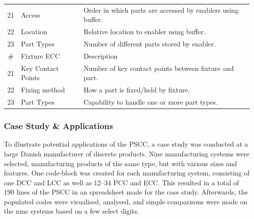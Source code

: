 \begin{table}[tb]
\begin{tabular}{cll}
    \midrule
    21 & Access & Order in which parts are accessed by enablers using buffer.\\
    22 & Location & Relative location to enabler using buffer.\\
    23 & Part Types & Number of different parts stored by enabler.\\
    \midrule
    \# & Fixture ECC & Description\\
    \midrule
    21 & Key Contact Points & Number of key contact points between fixture and part.\\
    22 & Fixing method & How a part is fixed/held by fixture.\\
    23 & Part Types & Capability to handle one or more part types.\\
    \bottomrule%
  \end{tabular}
\end{table}

\subsubsection*{Case Study \& Applications}
To illustrate potential applications of the PSCC, a case study was conducted at a large Danish manufacturer of discrete products.
Nine manufacturing systems were selected, manufacturing products of the same type, but with various sizes and features.
One code-block was created for each manufacturing system, consisting of one DCC and LCC as well as 12--34 PCC and ECC.
This resulted in a total of 190 lines of the PSCC in an spreadsheet made for the case study.
Afterwards, the populated codes were visualised, analysed, and simple comparisons were made on the nine systems based on a few select digits.


